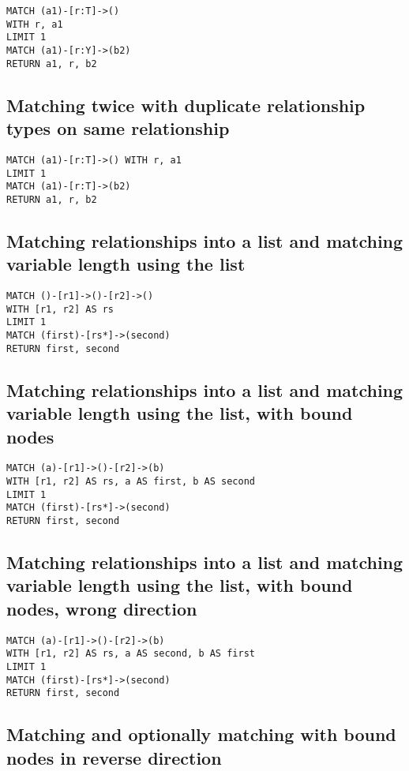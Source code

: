 \begin{lstlisting}
MATCH (a1)-[r:T]->()
WITH r, a1
LIMIT 1
MATCH (a1)-[r:Y]->(b2)
RETURN a1, r, b2
\end{lstlisting}

\subsection{Matching twice with duplicate relationship types on same relationship}

\begin{lstlisting}
MATCH (a1)-[r:T]->() WITH r, a1
LIMIT 1
MATCH (a1)-[r:T]->(b2)
RETURN a1, r, b2
\end{lstlisting}

\subsection{Matching relationships into a list and matching variable length using the list}

\begin{lstlisting}
MATCH ()-[r1]->()-[r2]->()
WITH [r1, r2] AS rs
LIMIT 1
MATCH (first)-[rs*]->(second)
RETURN first, second
\end{lstlisting}

\subsection{Matching relationships into a list and matching variable length using the list, with bound nodes}

\begin{lstlisting}
MATCH (a)-[r1]->()-[r2]->(b)
WITH [r1, r2] AS rs, a AS first, b AS second
LIMIT 1
MATCH (first)-[rs*]->(second)
RETURN first, second
\end{lstlisting}

\subsection{Matching relationships into a list and matching variable length using the list, with bound nodes, wrong direction}

\begin{lstlisting}
MATCH (a)-[r1]->()-[r2]->(b)
WITH [r1, r2] AS rs, a AS second, b AS first
LIMIT 1
MATCH (first)-[rs*]->(second)
RETURN first, second
\end{lstlisting}

\subsection{Matching and optionally matching with bound nodes in reverse direction}

